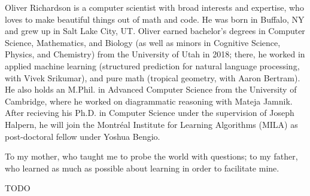 \documentclass[tocprelim,
    ]{cornellmodified}
\begin{document}
\begin{biosketch}
Oliver Richardson is a computer scientist 
    with broad interests and expertise,
    who loves to make beautiful things out of math and code.
He was born in Buffalo, NY and grew up in Salt Lake City, UT. 
Oliver earned bachelor's degrees in Computer Science, Mathematics, and Biology 
    (as well as minors in Cognitive Science, Physics, and Chemistry)
    from the University of Utah in 2018;
    there, he worked in applied machine learning 
        (structured prediction for natural language processing, with Vivek Srikumar),
    and pure math 
        (tropical geometry, with Aaron Bertram). 
He also holds an M.Phil. in Advanced Computer Science from the University of Cambridge, where he worked on diagrammatic reasoning with Mateja Jamnik. 
%
After recieving his Ph.D. in Computer Science under the supervision of Joseph Halpern, he will join the Montr\'{e}al Institute for Learning Algorithms (MILA) as post-doctoral fellow under Yoshua Bengio.
\end{biosketch}

\begin{dedication}
To my mother, 
    who taught me to probe the world with questions;
to my father,
    who learned as much as possible about learning in order to facilitate mine.
\end{dedication}

\begin{acknowledgements}
TODO


\end{acknowledgements}
\end{document}
